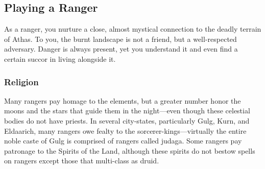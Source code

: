 



\subsection{Playing a Ranger}

As a ranger, you nurture a close, almost mystical connection to the deadly terrain of Athas. To you, the burnt landscape is not a friend, but a well-respected adversary. Danger is always present, yet you understand it and even find a certain succor in living alongside it.

\subsubsection{Religion}

Many rangers pay homage to the elements, but a greater number honor the moons and the stars that guide them in the night---even though these celestial bodies do not have priests. In several city-states, particularly Gulg,
Kurn, and Eldaarich, many rangers owe fealty to the sorcerer-kings---virtually the entire noble caste of Gulg is comprised of rangers called judaga. Some rangers pay patronage to the Spirits of the Land, although these spirits do not bestow spells on rangers except those that multi-class as druid.


